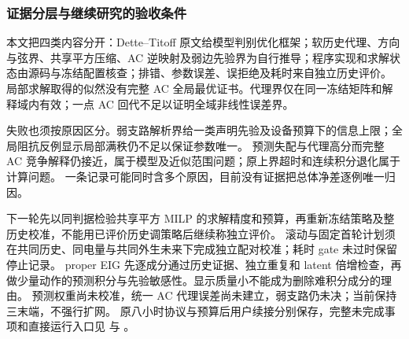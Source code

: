 \subsubsection{证据分层与继续研究的验收条件}
本文把四类内容分开：Dette--Titoff 原文给模型判别优化框架；软历史代理、方向与弦界、共享平方压缩、AC 逆映射及弱边先验界为自行推导；程序实现和求解状态由源码与冻结配置核查；排错、参数误差、误拒绝及耗时来自独立历史评价。
局部求解取得的似然没有完整 AC 全局最优证书。代理界仅在同一冻结矩阵和解释域内有效；一点 AC 回代不足以证明全域非线性误差界。

失败也须按原因区分。弱支路解析界给一类声明先验及设备预算下的信息上限；全局阻抗反例显示局部满秩仍不足以保证参数唯一。
预测失配与代理高分而完整 AC 竞争解释仍接近，属于模型及近似范围问题；原上界超时和连续积分退化属于计算问题。
一条记录可能同时含多个原因，目前没有证据把总体净差逐例唯一归因。

下一轮先以同判据检验共享平方 MILP 的求解精度和预算，再重新冻结策略及整历史校准，不能用已评价历史调策略后继续称独立评价。
滚动与固定首轮计划须在共同历史、同电量与共同外生未来下完成独立配对校准；耗时 gate 未过时保留停止记录。
proper EIG 先逐成分通过历史证据、独立重复和 latent 倍增检查，再做少量动作的预测积分与先验敏感性。显示质量小不能成为删除难积分成分的理由。
预测权重尚未校准，统一 AC 代理误差尚未建立，弱支路仍未决；当前保持三末端，不强行扩网。
原八小时协议与预算后用户续接分别保存，完整未完成事项和直接运行入口见  与 。
